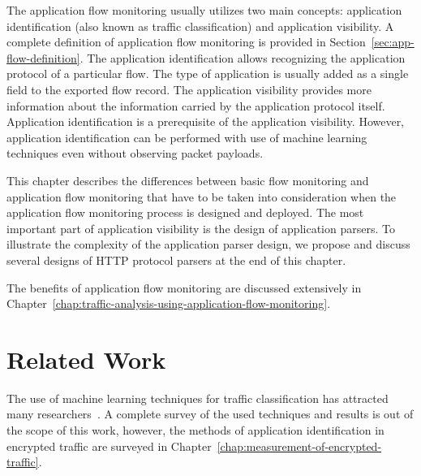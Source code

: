 The application flow monitoring usually utilizes two main concepts: application identification (also known as traffic classification) and application visibility. A complete definition of application flow monitoring is provided in Section~\ref{sec:app-flow-definition}. The application identification allows recognizing the application protocol of a particular flow. The type of application is usually added as a single field to the exported flow record. The application visibility provides more information about the information carried by the application protocol itself. Application identification is a prerequisite of the application visibility. However, application identification can be performed with use of machine learning techniques even without observing packet payloads.

This chapter describes the differences between basic flow monitoring and application flow monitoring that have to be taken into consideration when the application flow monitoring process is designed and deployed. The most important part of application visibility is the design of application parsers. To illustrate the complexity of the application parser design, we propose and discuss several designs of HTTP protocol parsers at the end of this chapter.

The benefits of application flow monitoring are discussed extensively in Chapter~\ref{chap:traffic-analysis-using-application-flow-monitoring}.

\section{Related Work}\label{sec:app-rel-work}

The use of machine learning techniques for traffic classification has attracted many researchers~\cite{Nguyen-2008-Survey, Dainotti-2012-Issues, Finsterbusch-2014-Survey}. A complete survey of the used techniques and results is out of the scope of this work, however, the methods of application identification in encrypted traffic are surveyed in Chapter~\ref{chap:measurement-of-encrypted-traffic}.

